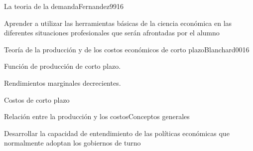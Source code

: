 \begin{syllabus}
\begin{unit}{La teoria de la demanda}{Fernandez99}{16}
\begin{unitgoals}
      \item Aprender a utilizar las herramientas básicas de la ciencia económica en las diferentes situaciones profesionales que serán afrontadas por el alumno
   \end{unitgoals}
\end{unit}


\begin{unit}{Teoría de la producción y de los costos económicos de corto plazo}{Blanchard00}{16}
\begin{topics}
	\item Función de producción de corto plazo.
	\item Rendimientos marginales decrecientes.
	\item Costos de corto plazo
	\item Relación entre la producción y los costosConceptos generales
\end{topics}

\begin{unitgoals}
      \item Desarrollar la capacidad de entendimiento de las políticas económicas que normalmente adoptan los gobiernos de turno
   \end{unitgoals}
\end{unit}

\begin{coursebibliography}
\end{coursebibliography}
\end{syllabus}





